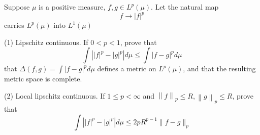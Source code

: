 \documentclass[12pt, a4paper, oneside]{book}
\begin{document}
\begin{theorem}
    Suppose $\mu$ is a positive measure, $f,g \in L^p(\mu)$. Let the natural map
    \begin{equation*}
        f\rightarrow \left|f\right|^p
    \end{equation*}
    carries $L^p(\mu)$ into $L^1(\mu)$

    (1) Lipschitz continuous. If $ 0<p<1$, prove that
    \begin{equation*}
        \int\left||f|^p-|g|^p\right| d \mu \leq \int|f-g|^p d \mu
    \end{equation*}
    that $\Delta(f, g)=\int|f-g|^p d \mu$ defines a metric on $L^p(\mu)$, and that the resulting metric space is complete.

    (2) Local lipschitz continuous. If $1 \leq p<\infty$ and $\left\| f \right\|_p \leq R,\left\| g \right\|_p \leq R$, prove that
    \begin{equation*}
        \int\left| \left|f\right|^p-\left|g\right|^p \right| d \mu \leq 2 p R^{p-1}\|f-g\|_p
    \end{equation*}
\end{theorem}
\end{document}
